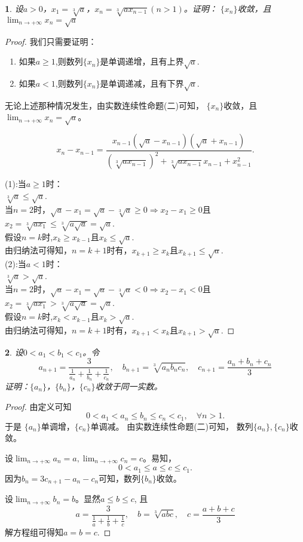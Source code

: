 \documentclass[utf8]{book}
\newtheorem{example}{}[section]             %
\begin{document}
\begin{example}
设$a> 0$，$x_1 =  \sqrt[3]{a}$，$x_n=\sqrt[3]{ax_{n-1}}(n> 1)$。证明： $\{x_n\}$收敛，且$\displaystyle  \lim_{n\to +\infty}x_n=\sqrt{a}$
\end{example}
\begin{proof}
我们只需要证明：
\renewcommand\labelenumi{\normalfont(\theenumi)}
\begin{enumerate}
\item 如果$a\geq 1$,则数列$\{x_n\}$是单调递增，且有上界$\sqrt{a}$.
\item 如果$a<1$,则数列$\{x_n\}$是单调递减，且有下界$\sqrt{a}$.
\end{enumerate}
无论上述那种情况发生，由实数连续性命题(二)可知， $\{x_n\}$收敛，且$\displaystyle  \lim_{n\to +\infty}x_n=\sqrt{a}$。

$$x_n - x_{n-1} = \displaystyle\frac{x_{n-1}(\sqrt{a}-x_{n-1})(\sqrt{a}+x_{n-1})}{\left(\sqrt[3]{ax_{n-1}}\right)^2 + \sqrt[3]{ax_{n-1}}x_{n-1}+x_{n-1}^2}.$$

\noindent(1):当$a\geq1$时：\\
$\sqrt[3]{a} \leq \sqrt{a}$.\\
当$n=2$时，$\sqrt{a}-x_1 = \sqrt{a}-\sqrt[3]{a} \geq 0 \Rightarrow x_2-x_1 \geq  0$且$x_2 = \sqrt[3]{ax_1} \leq \sqrt[3]{a \sqrt{a}} = \sqrt{a}$.\\
假设$n=k$时,$x_k \geq x_{k-1}$且$x_k \leq \sqrt{a}$.\\
由归纳法可得知，$n=k+1$时有，$x_{k+1} \geq x_k$且$x_{k+1}\leq \sqrt{a}$.\\

\noindent(2):当$a<1$时：\\
$\sqrt[3]{a} > \sqrt{a}$.\\
当$n=2$时，$\sqrt{a}-x_1 = \sqrt{a}-\sqrt[3]{a} < 0 \Rightarrow x_2-x_1 < 0$且$x_2 = \sqrt[3]{ax_1} > \sqrt[3]{a \sqrt{a}} = \sqrt{a}$.\\
假设$n=k$时,$x_k < x_{k-1}$且$x_k > \sqrt{a}$.\\
由归纳法可得知，$n=k+1$时有，$x_{k+1} < x_k$且$x_{k+1} > \sqrt{a}$.
\end{proof}
\begin{example}
设$0<a_1<b_1<c_1$。令
$$a_{n+1}=\frac{3}{\frac{1}{a_n}+\frac{1}{b_n}+\frac{1}{c_n}},\quad
b_{n+1} =  \sqrt[3]{a_nb_nc_n},\quad
c_{n+1}= \frac{a_n+b_n+c_n}{3}
$$
证明：$\{a_n\}$，$\{b_n\}$，$\{c_n\}$收敛于同一实数。
\end{example}
\begin{proof}
由定义可知$$0< a_1< a_n \leq b_n \leq c_n < c_1, \quad\forall n >1.$$
于是 $\{a_n\}$单调增，$\{c_n\}$单调减。
由实数连续性命题(二)可知， 数列$\{a_n\}, \{c_n\}$收敛。

设$\displaystyle  \lim_{n\to +\infty}a_n=a, \displaystyle  \lim_{n\to +\infty}c_n=c$。易知，$$0<a_1 \leq a\leq c\leq c_1.$$
因为$b_n = 3c_{n+1} - a_n - c_n$可知，数列$\{b_n\}$收敛。

设$\displaystyle \lim_{n\to +\infty}b_n=b$。显然$a\leq b\leq c$, 且
\begin{equation*}
a = \displaystyle\frac{3}{\frac{1}{a}+\frac{1}{b}+\frac{1}{c}},\quad
b = \displaystyle\sqrt[3]{abc},\quad
c = \displaystyle\frac{a+b+c}{3}
\end{equation*}
解方程组可得知$a=b=c$.
\end{proof}
\end{document}
